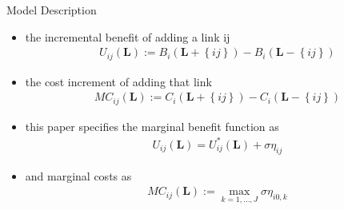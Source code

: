 \documentclass{beamer}		%
\begin{document}
\begin{frame}{Model Description}

\begin{itemize}
    \item the incremental benefit of adding a link ij
    \begin{align}
        U_{ij}(\bm{L}) := B_i(\bm{L} + \left\{ ij \right\}) - B_i(\bm{L} - \left\{ ij \right\})
    \end{align}
    
    \item the cost increment of adding that link
    \begin{align}
        MC_{ij}(\bm{L}) := C_i(\bm{L} + \left\{ ij \right\}) - C_i(\bm{L} - \left\{ ij \right\})
    \end{align}
    \pause
    
    \item this paper specifies the marginal benefit function as
    \begin{align}
        U_{ij}(\bm{L}) = U_{ij}^*(\bm{L}) + \sigma \eta_{ij}
    \end{align}
    
    \item and marginal costs as
    \begin{align}
        MC_{ij}(\bm{L}) := \max_{k=1,\ldots,J} \sigma \eta_{i0,k}
    \end{align}
        
    
\end{itemize}


    
\end{frame}
\end{document}
